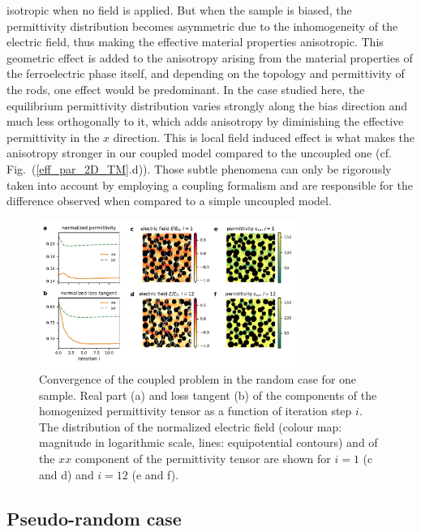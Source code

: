 \documentclass[%
 aip,
 amsmath,amssymb,
 reprint,%
linenumbers
]{revtex4-1}
\begin{document}
isotropic when no field is applied.
But when the sample is biased, the permittivity distribution becomes asymmetric due
to the inhomogeneity of the electric field, thus making the effective material properties anisotropic.
This geometric effect is added to the anisotropy arising from the material properties of the ferroelectric
phase itself, and depending on the topology and permittivity of the rods, one effect would be predominant.
In the case studied here, the equilibrium permittivity distribution varies strongly along the bias
 direction and much less orthogonally to it, which adds anisotropy by diminishing the effective
 permittivity in the $x$ direction. This is local field induced effect is what makes the anisotropy stronger
 in our coupled model compared to the uncoupled one (cf. Fig.~(\ref{eff_par_2D_TM}.d)).
Those subtle phenomena can only be rigorously taken into account by employing a coupling formalism
and are responsible for the difference observed when compared to a simple uncoupled model.\\
\begin{figure}[!t]
 \centering
 \includegraphics[width=0.75\textwidth]{convergence_rand}
 \caption{Convergence of the coupled problem in the random case
  for one sample.
  Real part (a) and loss tangent (b) of the components of the homogenized
  permittivity tensor as a function of iteration step $i$. The distribution of
  the normalized electric field (colour map: magnitude in logarithmic scale,
  lines: equipotential contours) and of the $xx$ component of the permittivity tensor are shown for $i=1$
  (c and d) and $i=12$ (e and f).
 }
 \label{conv_random}
\end{figure}

\subsection{Pseudo-random case}
\end{document}
